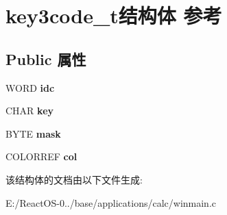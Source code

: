 \hypertarget{structkey3code__t}{}\section{key3code\+\_\+t结构体 参考}
\label{structkey3code__t}
\subsection*{Public 属性}
\begin{DoxyCompactItemize}
\item 
\mbox{\label{structkey3code__t_a9053a163d85186163f08e9842c32e133}} 
W\+O\+RD {\bfseries idc}
\item 
\mbox{\label{structkey3code__t_a1fbc63b71880d2a6b5bb0ddb91d8f8ca}} 
C\+H\+AR {\bfseries key}
\item 
\mbox{\label{structkey3code__t_ab3a9af2a93fd35c39af678c815fe0abf}} 
B\+Y\+TE {\bfseries mask}
\item 
\mbox{\label{structkey3code__t_a31e919a39068a57c568d181fa2a6dba6}} 
C\+O\+L\+O\+R\+R\+EF {\bfseries col}
\end{DoxyCompactItemize}


该结构体的文档由以下文件生成\+:\begin{DoxyCompactItemize}
\item 
E\+:/\+React\+O\+S-\/0../base/applications/calc/winmain.\+c\end{DoxyCompactItemize}

